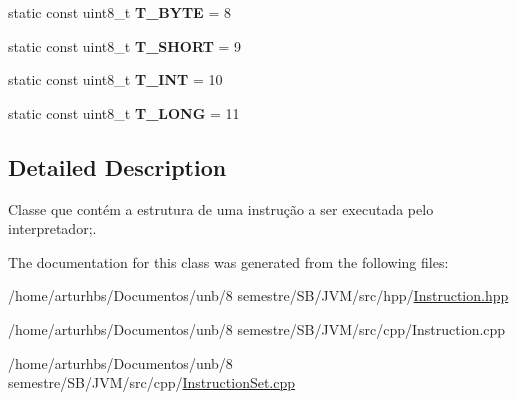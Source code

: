 \begin{DoxyCompactItemize}
\item 
static const uint8\+\_\+t {\bfseries T\+\_\+\+B\+Y\+TE} = 8\hypertarget{classInstruction_a4876cb8e45c582139e36ddb52c2b1377}{}\label{classInstruction_a4876cb8e45c582139e36ddb52c2b1377}

\item 
static const uint8\+\_\+t {\bfseries T\+\_\+\+S\+H\+O\+RT} = 9\hypertarget{classInstruction_a49747a04fe643bf002fa28f6f18ba2ab}{}\label{classInstruction_a49747a04fe643bf002fa28f6f18ba2ab}

\item 
static const uint8\+\_\+t {\bfseries T\+\_\+\+I\+NT} = 10\hypertarget{classInstruction_a987ec288d2592900e11d72bf4cf0c296}{}\label{classInstruction_a987ec288d2592900e11d72bf4cf0c296}

\item 
static const uint8\+\_\+t {\bfseries T\+\_\+\+L\+O\+NG} = 11\hypertarget{classInstruction_a9ce90541fd52ac9f175536f993ea9d8f}{}\label{classInstruction_a9ce90541fd52ac9f175536f993ea9d8f}

\end{DoxyCompactItemize}


\subsection{Detailed Description}
Classe que contém a estrutura de uma instrução a ser executada pelo interpretador;. 

The documentation for this class was generated from the following files\+:\begin{DoxyCompactItemize}
\item 
/home/arturhbs/\+Documentos/unb/8 semestre/\+S\+B/\+J\+V\+M/src/hpp/\hyperlink{Instruction_8hpp}{Instruction.\+hpp}\item 
/home/arturhbs/\+Documentos/unb/8 semestre/\+S\+B/\+J\+V\+M/src/cpp/Instruction.\+cpp\item 
/home/arturhbs/\+Documentos/unb/8 semestre/\+S\+B/\+J\+V\+M/src/cpp/\hyperlink{InstructionSet_8cpp}{Instruction\+Set.\+cpp}\end{DoxyCompactItemize}
